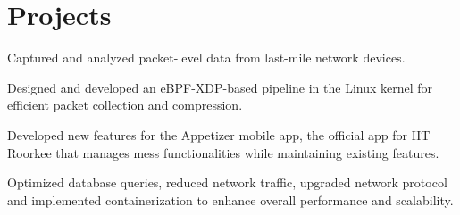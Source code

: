 \documentclass[letterpaper]{deedy-resume} %
\begin{document}
\begin{minipage}[t]{0.66\textwidth}
\sectionspace %



\section{Projects} 

\begin{tightitemize}
\item Captured and analyzed packet-level data from last-mile network devices.
\item Designed and developed an eBPF-XDP-based pipeline in the Linux kernel for efficient packet collection and compression.
\end{tightitemize}
\sectionspace %

\begin{tightitemize}
\item Developed new features for the Appetizer mobile app, the official app for IIT Roorkee that manages mess functionalities while maintaining existing features.
\item Optimized database queries, reduced network traffic, upgraded network protocol and implemented containerization to enhance overall performance and scalability.
\end{tightitemize}
\sectionspace %



\end{minipage}
\end{document}
